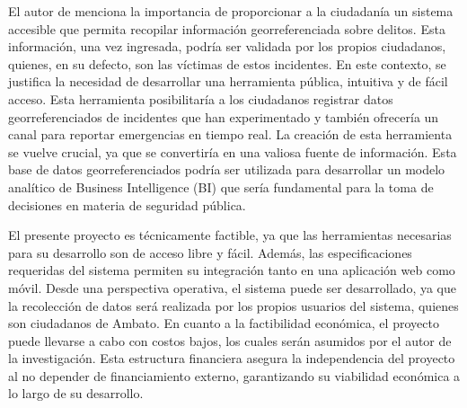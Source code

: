El autor de \cite{naranjo-avalosIMPACTOGEORREFERENCIACIONCOLABORATIVA2019} menciona la importancia de proporcionar a
la ciudadanía un sistema accesible que permita recopilar información georreferenciada sobre delitos. Esta información,
una vez ingresada, podría ser validada por los propios ciudadanos, quienes, en su defecto, son las víctimas de estos
incidentes. En este contexto, se justifica la necesidad de desarrollar una herramienta pública, intuitiva y de fácil acceso.
Esta herramienta posibilitaría a los ciudadanos registrar datos georreferenciados  de incidentes que han experimentado
y también ofrecería un canal para reportar emergencias en tiempo real. La creación de esta  herramienta se vuelve crucial,
ya que se convertiría en una valiosa fuente de información. Esta base de datos georreferenciados  podría ser utilizada
para desarrollar un modelo analítico de Business Intelligence (BI) que sería fundamental para la toma de  decisiones
en materia de seguridad pública.

\bigbreak
El presente proyecto es técnicamente factible, ya que las herramientas necesarias para su desarrollo son de acceso libre y
fácil. Además, las especificaciones requeridas del sistema permiten su integración tanto en una aplicación web como móvil.
Desde una perspectiva operativa, el sistema puede ser desarrollado, ya que la recolección de datos será realizada por los
propios usuarios del sistema, quienes son ciudadanos de Ambato.
En cuanto a la factibilidad económica, el proyecto puede llevarse a cabo con costos bajos, los cuales serán asumidos por
el autor de la investigación. Esta estructura financiera asegura la independencia del proyecto al no depender de financiamiento
externo, garantizando su viabilidad económica a lo largo de su desarrollo.